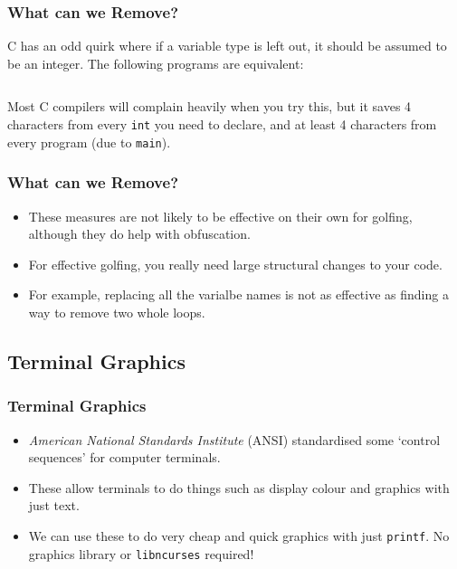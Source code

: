 \documentclass[xcolor]{beamer}
\begin{document}
\begin{frame}
	\frametitle{What can we Remove?}
	\pause
	
	\small
	
	C has an odd quirk where if a variable type is left out, it should be assumed to be an integer. The following programs are equivalent:
	\pause
	
	\begin{columns}
		\begin{column}{0.45\textwidth}
			\centering
			
		\end{column}
		\pause
		
		\begin{column}{0.45\textwidth}
			\centering
			
		\end{column}
	\end{columns}

	Most C compilers will complain heavily when you try this, but it saves 4 characters from every \texttt{int} you need to declare, and at least 4 characters from every program (due to \texttt{main}).
\end{frame}

\begin{frame}
	\frametitle{What can we Remove?}
	\pause
	
	\begin{itemize}
		\item These measures are not likely to be effective on their own for golfing, although they do help with obfuscation.
		\pause
		
		\item For effective golfing, you really need large structural changes to your code.
		\pause
		
		\item For example, replacing all the varialbe names is not as effective as finding a way to remove two whole loops.
	\end{itemize}
\end{frame}

\subsection{Terminal Graphics}

\begin{frame}
	\frametitle{Terminal Graphics}
	\pause
	
	\begin{itemize}
		\item \textit{American National Standards Institute} (ANSI) standardised some `control sequences' for computer terminals.
		\pause
		
		\item These allow terminals to do things such as display colour and graphics with just text.
		\pause
		
		\item We can use these to do very cheap and quick graphics with just \texttt{printf}. No graphics library or \texttt{libncurses} required!
	\end{itemize}
\end{frame}
\end{document}
